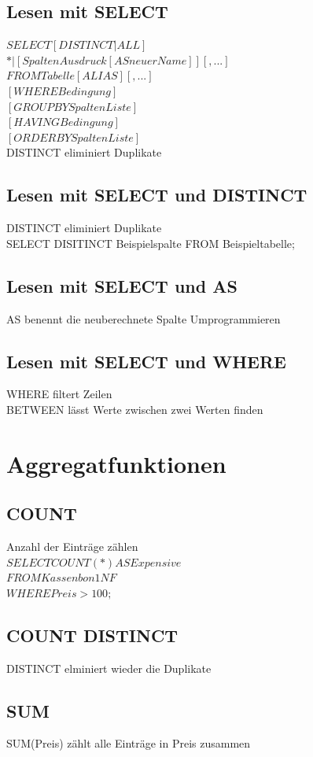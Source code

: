 \documentclass{scrreprt}
\begin{document}
\subsection{Lesen mit SELECT}
$SELECT [DISTINCT | ALL]$
\\${* | [SpaltenAusdruck [AS neuerName]][,...] }$
\\$FROM Tabelle [ALIAS] [, ...]$
\\$[WHERE Bedingung]$
\\$[GROUP BY SpaltenListe]$
\\$[HAVING Bedingung]$
\\$[ORDER BY SpaltenListe]$
\\DISTINCT eliminiert Duplikate
\subsection{Lesen mit SELECT und DISTINCT}
DISTINCT eliminiert Duplikate
\\SELECT DISITINCT Beispielspalte FROM Beispieltabelle;
\subsection{Lesen mit SELECT und AS}
AS benennt die neuberechnete Spalte Umprogrammieren
\subsection{Lesen mit SELECT und WHERE}
WHERE filtert Zeilen
\\BETWEEN lässt Werte zwischen zwei Werten finden
\section{Aggregatfunktionen}
\subsection{COUNT}
Anzahl der Einträge zählen
\\$SELECT COUNT(*) AS Expensive$
\\$FROM Kassenbon1NF$
\\$WHERE Preis > 100;$
\subsection{COUNT DISTINCT}
DISTINCT elminiert wieder die Duplikate
\subsection{SUM}
SUM(Preis) zählt alle Einträge in Preis zusammen
\end{document}
